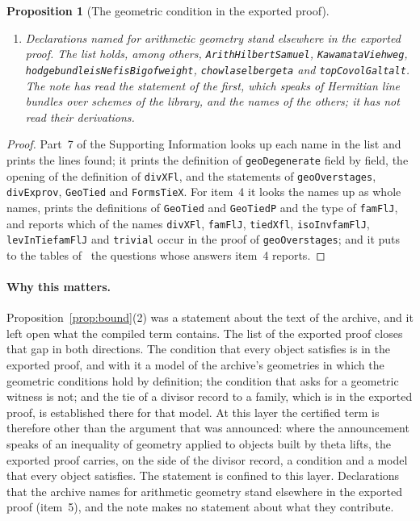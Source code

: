 \documentclass[11pt]{article}
\newtheorem{proposition}[theorem]{Proposition}
\theoremstyle{definition}
\theoremstyle{remark}
\DeclareRobustCommand{\lean}[1]{{\renewcommand{\_}{\textunderscore\allowbreak}\texttt{#1}}}
\begin{document}
\begin{proposition}[The geometric condition in the exported proof]
\begin{enumerate}[leftmargin=2em,itemsep=1pt]
\item \emph{Declarations named for arithmetic geometry stand elsewhere in the exported proof.} The list holds, among others, \lean{ArithHilbertSamuel}, \lean{KawamataViehweg}, \lean{hodge\_bundle\_isNef\_isBig\_of\_weight}, \lean{chowla\_selberg\_eta} and \lean{topCovolG\_alt\_alt}. The note has read the statement of the first, which speaks of Hermitian line bundles over schemes of the library, and the names of the others; it has not read their derivations.
\end{enumerate}
\end{proposition}

\begin{proof}
Part~7 of the Supporting Information looks up each name in the list and prints the lines found; it prints the definition of \lean{geoDegenerate} field by field, the opening of the definition of \lean{divXFl}, and the statements of \lean{geoOver\_stages}, \lean{divEx\_prov}, \lean{GeoTied} and \lean{FormsTieX}. For item~4 it looks the names up as whole names, prints the definitions of \lean{GeoTied} and \lean{GeoTiedP} and the type of \lean{famFlJ}, and reports which of the names \lean{divXFl}, \lean{famFlJ}, \lean{tiedX\_fl}, \lean{isoInv\_famFlJ}, \lean{levInTie\_famFlJ} and \lean{trivial} occur in the proof of \lean{geoOver\_stages}; and it puts to the tables of~\citet{shore} the questions whose answers item~4 reports.
\end{proof}

\paragraph{Why this matters.} Proposition~\ref{prop:bound}(2) was a statement about the text of the archive, and it left open what the compiled term contains. The list of the exported proof closes that gap in both directions. The condition that every object satisfies is in the exported proof, and with it a model of the archive's geometries in which the geometric conditions hold by definition; the condition that asks for a geometric witness is not; and the tie of a divisor record to a family, which is in the exported proof, is established there for that model. At this layer the certified term is therefore other than the argument that was announced: where the announcement speaks of an inequality of geometry applied to objects built by theta lifts, the exported proof carries, on the side of the divisor record, a condition and a model that every object satisfies. The statement is confined to this layer. Declarations that the archive names for arithmetic geometry stand elsewhere in the exported proof (item~5), and the note makes no statement about what they contribute.
\end{document}
